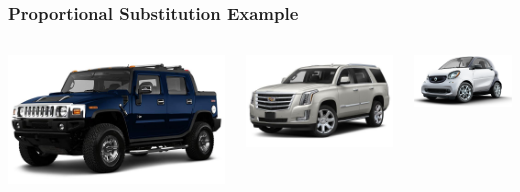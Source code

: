 \documentclass{beamer}
\begin{document}
\begin{frame}\frametitle{Proportional Substitution Example}
    \begin{columns}
    	\begin{column}{0.333\textwidth}
    		\includegraphics[width=\textwidth]{hummer.jpg}
    	\end{column}
    	\begin{column}{0.333\textwidth}
    		\includegraphics[width=\textwidth]{escalade.jpg}
    	\end{column}
    	\begin{column}{0.333\textwidth}
    		\includegraphics[width=\textwidth]{smart.png}

\end{column}
\end{columns}
\end{frame}
\end{document}
